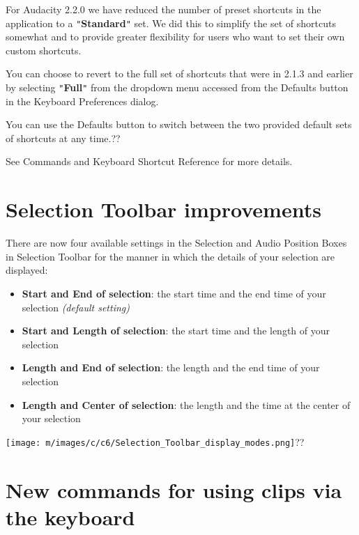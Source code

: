 For Audacity 2.2.0 we have reduced the number of preset shortcuts in the application to a \texttt{{}"{}}\textbf{Standard}\texttt{{}"{}} set.  We did this to simplify the set of shortcuts somewhat and to provide greater flexibility for users who want to set their own custom shortcuts.

You can choose to revert to the full set of shortcuts that were in 2.1.3 and earlier by selecting \texttt{{}"{}}\textbf{Full}\texttt{{}"{}} from the dropdown menu accessed from the Defaults button in the Keyboard Preferences dialog.

You can use the Defaults button to switch between the two provided default sets of shortcuts at any time.??

See Commands and Keyboard Shortcut Reference for more details.


\section{Selection Toolbar improvements}


There are now four available settings in the Selection and Audio Position Boxes in Selection Toolbar for the  manner in which the details of your selection are displayed:
\begin{itemize}
\item \textbf{Start and End of selection}: the start time and the end time of your selection \textit{(default setting)}
\item \textbf{Start and Length of selection}: the start time and the length of your selection
\item \textbf{Length and End of selection}: the length and the end time of your selection
\item \textbf{Length and Center of selection}: the length and the time at the center of your selection
\end{itemize}
\texttt{[image: m/images/c/c6/Selection\_Toolbar\_display\_modes.png]}??

\section{New commands for using clips via the keyboard}


